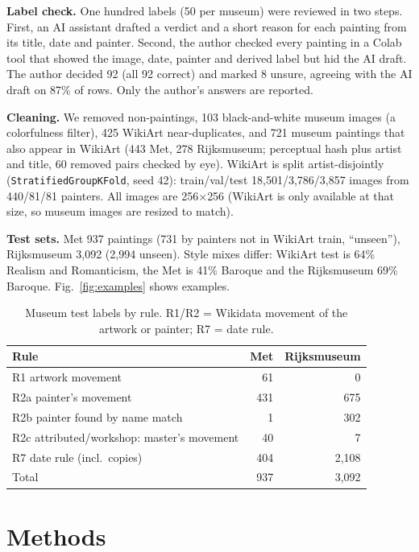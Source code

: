 \documentclass[conference]{IEEEtran}
\begin{document}
\textbf{Label check.} One hundred labels (50 per museum) were reviewed in two steps. First, an AI assistant drafted a verdict and a short reason for each painting from its title, date and painter. Second, the author checked every painting in a Colab tool that showed the image, date, painter and derived label but hid the AI draft. The author decided 92 (all 92 correct) and marked 8 unsure, agreeing with the AI draft on 87\% of rows. Only the author's answers are reported.

\textbf{Cleaning.} We removed non-paintings, 103 black-and-white museum images (a colorfulness filter), 425 WikiArt near-duplicates, and 721 museum paintings that also appear in WikiArt (443 Met, 278 Rijksmuseum; perceptual hash plus artist and title, 60 removed pairs checked by eye). WikiArt is split artist-disjointly (\texttt{StratifiedGroupKFold}, seed 42): train/val/test 18,501/3,786/3,857 images from 440/81/81 painters. All images are 256$\times$256 (WikiArt is only available at that size, so museum images are resized to match).

\textbf{Test sets.} Met 937 paintings (731 by painters not in WikiArt train, ``unseen''), Rijksmuseum 3,092 (2,994 unseen). Style mixes differ: WikiArt test is 64\% Realism and Romanticism, the Met is 41\% Baroque and the Rijksmuseum 69\% Baroque. Fig.~\ref{fig:examples} shows examples.

\begin{table}[t]
\centering
\caption{Museum test labels by rule. R1/R2 = Wikidata movement of the artwork or painter; R7 = date rule.}
\label{tab:rules}
\begin{tabular}{lrr}
\toprule
Rule & Met & Rijksmuseum \\
\midrule
R1 artwork movement & 61 & 0 \\
R2a painter's movement & 431 & 675 \\
R2b painter found by name match & 1 & 302 \\
R2c attributed/workshop: master's movement & 40 & 7 \\
R7 date rule (incl.\ copies) & 404 & 2,108 \\
\midrule
Total & 937 & 3,092 \\
\bottomrule
\end{tabular}
\end{table}

\section{Methods}
\end{document}
